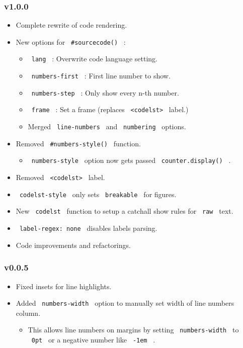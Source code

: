 \subsubsection{v1.0.0}\label{v1.0.0}

\begin{itemize}
\tightlist
\item
  Complete rewrite of code rendering.
\item
  New options for \texttt{\ \#sourcecode()\ } :

  \begin{itemize}
  \tightlist
  \item
    \texttt{\ lang\ } : Overwrite code language setting.
  \item
    \texttt{\ numbers-first\ } : First line number to show.
  \item
    \texttt{\ numbers-step\ } : Only show every n-th number.
  \item
    \texttt{\ frame\ } : Set a frame (replaces
    \texttt{\ \textless{}codelst\textgreater{}\ } label.)
  \item
    Merged \texttt{\ line-numbers\ } and \texttt{\ numbering\ } options.
  \end{itemize}
\item
  Removed \texttt{\ \#numbers-style()\ } function.

  \begin{itemize}
  \tightlist
  \item
    \texttt{\ numbers-style\ } option now gets passed
    \texttt{\ counter.display()\ } .
  \end{itemize}
\item
  Removed \texttt{\ \textless{}codelst\textgreater{}\ } label.
\item
  \texttt{\ codelst-style\ } only sets \texttt{\ breakable\ } for
  figures.
\item
  New \texttt{\ codelst\ } function to setup a catchall show rules for
  \texttt{\ raw\ } text.
\item
  \texttt{\ label-regex:\ none\ } disables labels parsing.
\item
  Code improvements and refactorings.
\end{itemize}

\subsubsection{v0.0.5}\label{v0.0.5}

\begin{itemize}
\tightlist
\item
  Fixed insets for line highlights.
\item
  Added \texttt{\ numbers-width\ } option to manually set width of line
  numbers column.

  \begin{itemize}
  \tightlist
  \item
    This allows line numbers on margins by setting
    \texttt{\ numbers-width\ } to \texttt{\ 0pt\ } or a negative number
    like \texttt{\ -1em\ } .
  \end{itemize}
\end{itemize}

